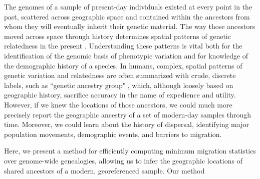The genomes of a sample of present-day individuals existed at every point in the past, 
scattered across geographic space and contained within the ancestors 
from whom they will eventually inherit their genetic material.
The way those ancestors moved across space through history 
determines spatial patterns of genetic relatedness in the present \citep{Bradburd_Ralph_2019}.
Understanding these patterns is vital both for 
the identification of the genomic basis of phenotypic variation 
and for 
knowledge of the demographic history of a species.
In humans, 
complex, spatial patterns of genetic variation and relatedness 
are often summarized with crude, discrete labels, 
such as ``genetic ancestry group" \citep{Coop_2022}, 
which, although loosely based on geographic history, 
sacrifice accuracy in the name of expedience and utility.
However, if we knew the locations of those ancestors, 
we could much more precisely report the geographic ancestry 
of a set of modern-day samples through time.
Moreover, we could learn about the history of dispersal, 
identifying major population movements, 
demographic events, and 
barriers to migration.

Here, we present a method for efficiently computing 
minimum migration statistics over genome-wide genealogies, 
allowing us to infer the geographic locations of shared ancestors 
of a modern, georeferenced sample.
Our method 


